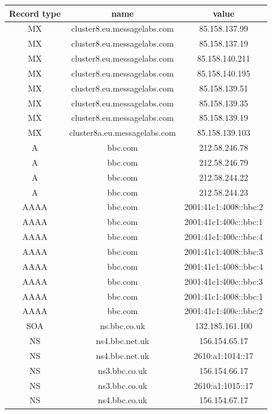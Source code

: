 \documentclass[conference]{IEEEtran}
\begin{document}
\begin{table}[h!]
     \centering
     \begin{tabular}{|c|c|c|}
        \hline
        
        Record type & name & value
    \\
        \hline
        MX & cluster8.eu.messagelabs.com & 85.158.137.99\\
        MX & cluster8.eu.messagelabs.com & 85.158.137.19\\
        MX & cluster8.eu.messagelabs.com & 85.158.140.211\\
        MX & cluster8.eu.messagelabs.com & 85.158.140.195\\
        MX & cluster8.eu.messagelabs.com & 85.158.139.51\\
        MX & cluster8.eu.messagelabs.com & 85.158.139.35\\
        MX & cluster8.eu.messagelabs.com & 85.158.139.19\\
        MX & cluster8a.eu.messagelabs.com & 85.158.139.103\\
        A & bbc.com & 212.58.246.78\\
        A & bbc.com & 212.58.246.79\\
        A & bbc.com & 212.58.244.22\\
        A & bbc.com & 212.58.244.23\\
        AAAA & bbc.com & 2001:41c1:4008::bbc:2\\
        AAAA & bbc.com & 2001:41c1:400c::bbc:1\\
        AAAA & bbc.com & 2001:41c1:400c::bbc:4\\
        AAAA & bbc.com & 2001:41c1:4008::bbc:3\\
        AAAA & bbc.com & 2001:41c1:4008::bbc:4\\
        AAAA & bbc.com & 2001:41c1:400c::bbc:3\\
        AAAA & bbc.com & 2001:41c1:4008::bbc:1\\
        AAAA & bbc.com & 2001:41c1:400c::bbc:2\\
        SOA & ns.bbc.co.uk & 132.185.161.100\\
        NS & ns4.bbc.net.uk & 156.154.65.17\\
        NS & ns4.bbc.net.uk & 2610:a1:1014::17\\
        NS & ns3.bbc.co.uk & 156.154.66.17\\
        NS & ns3.bbc.co.uk & 2610:a1:1015::17\\
        NS & ns4.bbc.co.uk & 156.154.67.17\\

\end{tabular}
\end{table}
\end{document}
